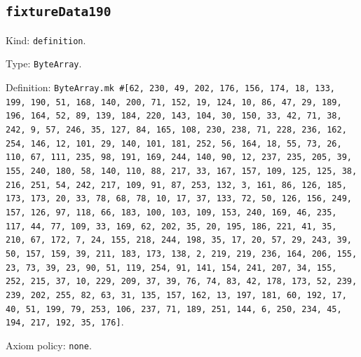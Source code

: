 \documentclass[11pt]{article}
\begin{document}
\subsection*{\texttt{fixtureData190}}
\noindent Kind: \texttt{definition}.\par
\noindent Type: \texttt{ByteArray}.\par
\noindent Definition: \texttt{ByteArray.mk \#[62, 230, 49, 202, 176, 156, 174, 18, 133, 199, 190, 51, 168, 140, 200, 71, 152, 19, 124, 10, 86, 47, 29, 189, 196, 164, 52, 89, 139, 184, 220, 143, 104, 30, 150, 33, 42, 71, 38, 242, 9, 57, 246, 35, 127, 84, 165, 108, 230, 238, 71, 228, 236, 162, 254, 146, 12, 101, 29, 140, 101, 181, 252, 56, 164, 18, 55, 73, 26, 110, 67, 111, 235, 98, 191, 169, 244, 140, 90, 12, 237, 235, 205, 39, 155, 240, 180, 58, 140, 110, 88, 217, 33, 167, 157, 109, 125, 125, 38, 216, 251, 54, 242, 217, 109, 91, 87, 253, 132, 3, 161, 86, 126, 185, 173, 173, 20, 33, 78, 68, 78, 10, 17, 37, 133, 72, 50, 126, 156, 249, 157, 126, 97, 118, 66, 183, 100, 103, 109, 153, 240, 169, 46, 235, 117, 44, 77, 109, 33, 169, 62, 202, 35, 20, 195, 186, 221, 41, 35, 210, 67, 172, 7, 24, 155, 218, 244, 198, 35, 17, 20, 57, 29, 243, 39, 50, 157, 159, 39, 211, 183, 173, 138, 2, 219, 219, 236, 164, 206, 155, 23, 73, 39, 23, 90, 51, 119, 254, 91, 141, 154, 241, 207, 34, 155, 252, 215, 37, 10, 229, 209, 37, 39, 76, 74, 83, 42, 178, 173, 52, 239, 239, 202, 255, 82, 63, 31, 135, 157, 162, 13, 197, 181, 60, 192, 17, 40, 51, 199, 79, 253, 106, 237, 71, 189, 251, 144, 6, 250, 234, 45, 194, 217, 192, 35, 176]}.\par
\noindent Axiom policy: \texttt{none}.\par
\end{document}
